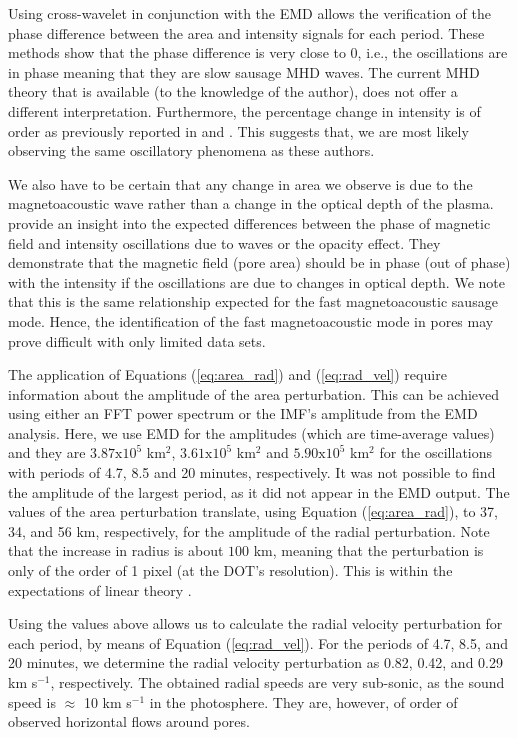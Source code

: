    Using cross-wavelet in conjunction with the EMD allows the verification of the phase difference between the area and intensity signals for each period. 
    These methods show that the phase difference is very close to 0\degree, i.e., the oscillations are in phase meaning that they are slow sausage MHD waves.
    The current MHD theory that is available (to the knowledge of the author), does not offer a different interpretation.	
    Furthermore, the percentage change in intensity is of order as previously reported in \citet{Balthasar2000} and \citet{PMHDW}.
    This suggests that, we are most likely observing the same oscillatory phenomena as these authors.
    
    We also have to be certain that any change in area we observe is due to the magnetoacoustic wave rather than a change in the optical depth of the plasma.
    \citet{PMHDW} provide an insight into the expected differences between the phase of magnetic field and intensity oscillations due to waves or the opacity effect.
    They demonstrate that the magnetic field (pore area) should be in phase (out of phase) with the intensity if the oscillations are due to changes in optical depth.
    We note that this is the same relationship expected for the fast magnetoacoustic sausage mode.
    Hence, the identification of the fast magnetoacoustic mode in pores may prove difficult with only limited data sets.
    
    The application of Equations (\ref{eq:area_rad}) and (\ref{eq:rad_vel}) require information about the amplitude of the area perturbation.
    This can be achieved using either an FFT power spectrum or the IMF's amplitude from the EMD analysis.
    Here, we use EMD for the amplitudes (which are time-average values) and they are $3.87\mathrm{x}10^5$ km$^2$, $3.61\mathrm{x}10^5$ km$^2$ and $5.90\mathrm{x}10^5$ km$^2$ for the oscillations with periods of 4.7, 8.5 and 20 minutes, respectively.
    It was not possible to find the amplitude of the largest period, as it did not appear in the EMD output.
    The values of the area perturbation translate, using Equation (\ref{eq:area_rad}), to 37, 34, and 56 km, respectively, for the amplitude of the radial perturbation.
    Note that the increase in radius is about $100$ km, meaning that the perturbation is only of the order of 1 pixel (at the DOT's resolution).
    This is within the expectations of linear theory \citep{Moreels2013,Moreels2013b,jess2015multiwavelength}.
    
    Using the values above allows us to calculate the radial velocity perturbation for each period, by means of Equation (\ref{eq:rad_vel}).
    For the periods of 4.7, 8.5, and 20 minutes, we determine the radial velocity perturbation as 0.82, 0.42, and 0.29 km s$^{-1}$, respectively.
    The obtained radial speeds are very sub-sonic, as the sound speed is $\approx$ 10 km s$^{-1}$ in the photosphere.
    They are, however, of order of observed horizontal flows around pores.
    
